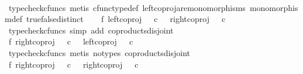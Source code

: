 \begin{isabellebody}
\ \ \ \ \isamarkupfalse%
\ {\isacharparenleft}{\kern0pt}typecheck{\isacharunderscore}{\kern0pt}cfuncs{\isacharcomma}{\kern0pt}\ metis\ cfunc{\isacharunderscore}{\kern0pt}type{\isacharunderscore}{\kern0pt}def\ left{\isacharunderscore}{\kern0pt}coproj{\isacharunderscore}{\kern0pt}are{\isacharunderscore}{\kern0pt}monomorphisms\ monomorphism{\isacharunderscore}{\kern0pt}def\ true{\isacharunderscore}{\kern0pt}false{\isacharunderscore}{\kern0pt}distinct{\isacharparenright}{\kern0pt}\isanewline
\ \ \isamarkupfalse%
\ f{}{\isacharcolon}{\kern0pt}\ {\isachardoublequoteopen}{\isacharparenleft}{\kern0pt}left{\isacharunderscore}{\kern0pt}coproj\ {\isasymOmega}\ {\isasymOmega}{\isacharparenright}{\kern0pt}\ {\isasymcirc}\isactrlsub c\ {\isasymt}\ {\isasymnoteq}\ {\isacharparenleft}{\kern0pt}right{\isacharunderscore}{\kern0pt}coproj\ {\isasymOmega}\ {\isasymOmega}{\isacharparenright}{\kern0pt}\ {\isasymcirc}\isactrlsub c\ {\isasymf}{\isachardoublequoteclose}\isanewline
\ \ \ \ \isamarkupfalse%
\ {\isacharparenleft}{\kern0pt}typecheck{\isacharunderscore}{\kern0pt}cfuncs{\isacharcomma}{\kern0pt}\ simp\ add{\isacharcolon}{\kern0pt}\ coproducts{\isacharunderscore}{\kern0pt}disjoint{\isacharparenright}{\kern0pt}\isanewline
\ \ \isamarkupfalse%
\ f{}{\isacharcolon}{\kern0pt}\ {\isachardoublequoteopen}{\isacharparenleft}{\kern0pt}right{\isacharunderscore}{\kern0pt}coproj\ {\isasymOmega}\ {\isasymOmega}{\isacharparenright}{\kern0pt}\ {\isasymcirc}\isactrlsub c\ {\isasymt}\ {\isasymnoteq}\ {\isacharparenleft}{\kern0pt}left{\isacharunderscore}{\kern0pt}coproj\ {\isasymOmega}\ {\isasymOmega}{\isacharparenright}{\kern0pt}\ {\isasymcirc}\isactrlsub c\ {\isasymf}{\isachardoublequoteclose}\isanewline
\ \ \ \ \isamarkupfalse%
\ {\isacharparenleft}{\kern0pt}typecheck{\isacharunderscore}{\kern0pt}cfuncs{\isacharcomma}{\kern0pt}\ metis\ {\isacharparenleft}{\kern0pt}no{\isacharunderscore}{\kern0pt}types{\isacharparenright}{\kern0pt}\ coproducts{\isacharunderscore}{\kern0pt}disjoint{\isacharparenright}{\kern0pt}\isanewline
\ \ \isamarkupfalse%
\ f{}{\isacharcolon}{\kern0pt}\ {\isachardoublequoteopen}{\isacharparenleft}{\kern0pt}right{\isacharunderscore}{\kern0pt}coproj\ {\isasymOmega}\ {\isasymOmega}{\isacharparenright}{\kern0pt}\ {\isasymcirc}\isactrlsub c\ {\isasymt}\ {\isasymnoteq}\ {\isacharparenleft}{\kern0pt}right{\isacharunderscore}{\kern0pt}coproj\ {\isasymOmega}\ {\isasymOmega}{\isacharparenright}{\kern0pt}\ {\isasymcirc}\isactrlsub c\ {\isasymf}{\isachardoublequoteclose}\isanewline

\end{isabellebody}
